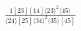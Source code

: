 \documentclass[varwidth, border=5pt]{standalone}
\begin{document}
\begin{my}
$\begin{gathered}
\scriptscriptstyle\frac{1[23][14]⟨23⟩^2⟨45⟩}{⟨24⟩[25]⟨34⟩^2⟨35⟩[45]}
\end{gathered}$
\end{my}
\end{document}
